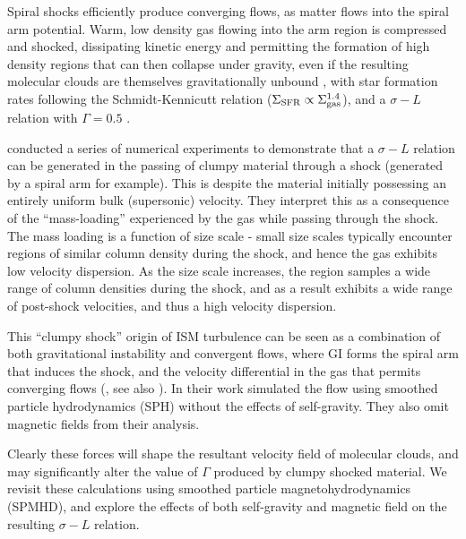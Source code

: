 \documentclass[a4paper,fleqn,usenatbib]{mnras}
\begin{document}
Spiral shocks efficiently produce converging flows, as matter flows into the spiral arm potential.  Warm, low density gas flowing into the arm region is compressed and shocked, dissipating kinetic energy and permitting the formation of high density regions that can then collapse under gravity, even if the resulting molecular clouds are themselves gravitationally unbound \citep{Bonnell2006}, with star formation rates following the Schmidt-Kennicutt relation ($\Sigma_{\rm SFR} \propto \Sigma_{\rm gas}^{1.4}$), and a $\sigma-L$ relation with $\Gamma = 0.5$ \citep{Bonnell2013} .   

\citet{Dobbs2007} conducted a series of numerical experiments to demonstrate that a $\sigma-L$ relation can be generated in the passing of clumpy material through a shock (generated by a spiral arm for example).  This is despite the material initially possessing an entirely uniform bulk (supersonic) velocity.  They interpret this as a consequence of the ``mass-loading'' experienced by the gas  while passing through the shock.  The mass loading is a function of size scale - small size scales typically encounter regions of similar column density during the shock, and hence the gas exhibits low velocity dispersion.  As the size scale increases, the region samples a wide range of column densities during the shock, and as a result exhibits a wide range of post-shock velocities, and thus a high velocity dispersion.

This ``clumpy shock'' origin of ISM turbulence can be seen as a combination of both gravitational instability and convergent flows, where GI forms the spiral arm that induces the shock, and the velocity differential in the gas that permits converging flows (\citealt{Bonnell2013}, see also \citealt{Falceta-Goncalves2014}).  In their work \citet{Dobbs2007} simulated the flow using smoothed particle hydrodynamics (SPH) without the effects of self-gravity.   They also omit magnetic fields from their analysis. 

Clearly these forces will shape the resultant velocity field of molecular clouds, and may significantly alter the value of $\Gamma$ produced by clumpy shocked material.  We revisit these calculations using smoothed particle magnetohydrodynamics (SPMHD), and explore the effects of both self-gravity and magnetic field on the resulting $\sigma-L$ relation.

\end{document}
